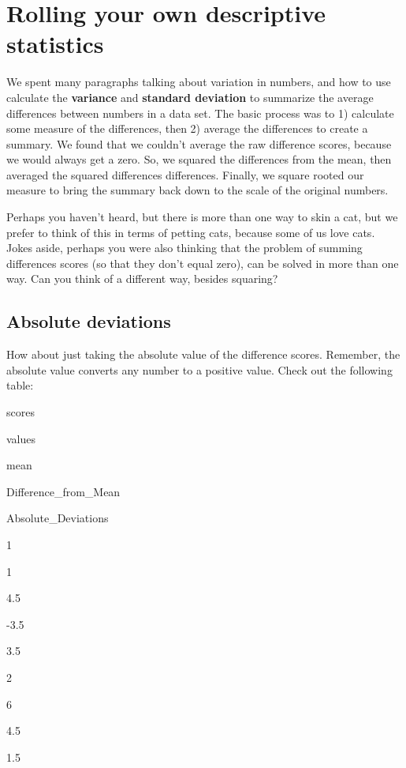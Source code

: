 \documentclass[
]{book}
\begin{document}
\hypertarget{rolling-your-own-descriptive-statistics}{%
\section{Rolling your own descriptive statistics}\label{rolling-your-own-descriptive-statistics}}

We spent many paragraphs talking about variation in numbers, and how to use calculate the \textbf{variance} and \textbf{standard deviation} to summarize the average differences between numbers in a data set. The basic process was to 1) calculate some measure of the differences, then 2) average the differences to create a summary. We found that we couldn't average the raw difference scores, because we would always get a zero. So, we squared the differences from the mean, then averaged the squared differences differences. Finally, we square rooted our measure to bring the summary back down to the scale of the original numbers.

Perhaps you haven't heard, but there is more than one way to skin a cat, but we prefer to think of this in terms of petting cats, because some of us love cats. Jokes aside, perhaps you were also thinking that the problem of summing differences scores (so that they don't equal zero), can be solved in more than one way. Can you think of a different way, besides squaring?

\hypertarget{absolute-deviations}{%
\subsection{Absolute deviations}\label{absolute-deviations}}

How about just taking the absolute value of the difference scores. Remember, the absolute value converts any number to a positive value. Check out the following table:

scores

values

mean

Difference\_from\_Mean

Absolute\_Deviations

1

1

4.5

-3.5

3.5

2

6

4.5

1.5
\end{document}
